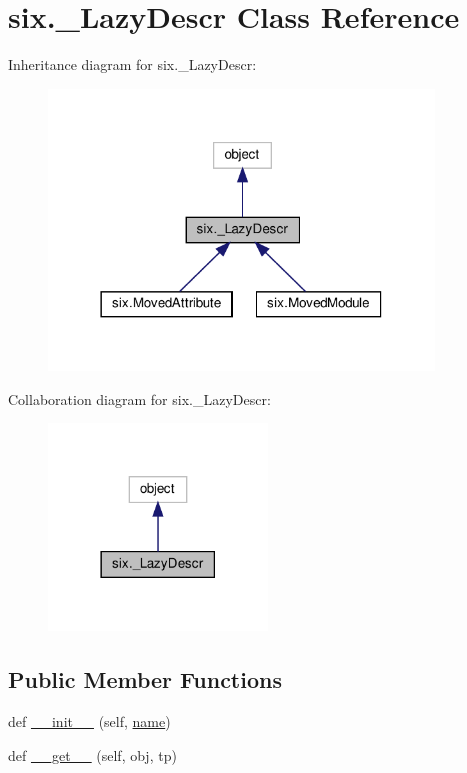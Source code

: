 \hypertarget{classsix_1_1__LazyDescr}{}\section{six.\+\_\+\+Lazy\+Descr Class Reference}
\label{classsix_1_1__LazyDescr}


Inheritance diagram for six.\+\_\+\+Lazy\+Descr\+:
\nopagebreak
\begin{figure}[H]
\begin{center}
\leavevmode
\includegraphics[width=290pt]{classsix_1_1__LazyDescr__inherit__graph}
\end{center}
\end{figure}


Collaboration diagram for six.\+\_\+\+Lazy\+Descr\+:
\nopagebreak
\begin{figure}[H]
\begin{center}
\leavevmode
\includegraphics[width=165pt]{classsix_1_1__LazyDescr__coll__graph}
\end{center}
\end{figure}
\subsection*{Public Member Functions}
\begin{DoxyCompactItemize}
\item 
def \hyperlink{classsix_1_1__LazyDescr_a36b331b4c5406cb9737933449dafba71}{\+\_\+\+\_\+init\+\_\+\+\_\+} (self, \hyperlink{classsix_1_1__LazyDescr_ad45b705c0f4b63da8bcd1311527b2591}{name})
\item 
def \hyperlink{classsix_1_1__LazyDescr_a55983d01a267a05c04d166df35a8f8fe}{\+\_\+\+\_\+get\+\_\+\+\_\+} (self, obj, tp)
\end{DoxyCompactItemize}
